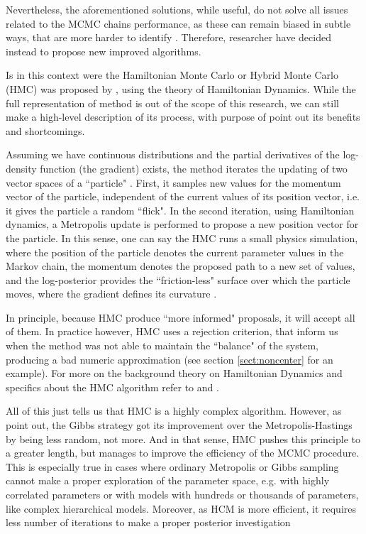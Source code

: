 Nevertheless, the aforementioned solutions, while useful, do not solve all issues related to the MCMC chains performance, as these can remain biased in subtle ways, that are more harder to identify \cite{McElreath_2020}. Therefore, researcher have decided instead to propose new improved algorithms. 

Is in this context were the Hamiltonian Monte Carlo or Hybrid Monte Carlo (HMC) was proposed by \citet{Duane_et_al_1987}, using the theory of Hamiltonian Dynamics. While the full representation of method is out of the scope of this research, we can still make a high-level description of its process, with purpose of point out its benefits and shortcomings. 

Assuming we have continuous distributions and the partial derivatives of the log-density function (the gradient) exists, the method iterates the updating of two vector spaces of a ``particle" \cite{Neal_2011, McElreath_2020}. First, it samples new values for the momentum vector of the particle, independent of the current values of its position vector, i.e. it gives the particle a random ``flick". In the second iteration, using Hamiltonian dynamics, a Metropolis update is performed to propose a new position vector for the particle. In this sense, one can say the HMC runs a small physics simulation, where the position of the particle denotes the current parameter values in the Markov chain, the momentum denotes the proposed path to a new set of values, and the log-posterior provides the ``friction-less" surface over which the particle moves, where the gradient defines its curvature \cite{McElreath_2020}.

In principle, because HMC produce ``more informed" proposals, it will accept all of them. In practice however, HMC uses a rejection criterion, that inform us when the method was not able to maintain the ``balance" of the system, producing a bad numeric approximation (see section \ref{sect:noncenter} for an example). For more on the background theory on Hamiltonian Dynamics and specifics about the HMC algorithm refer to \citet{Neal_2011} and \citet{Betancourt_et_al_2013}.

All of this just tells us that HMC is a highly complex algorithm. However, as \citet{McElreath_2020} point out, the Gibbs strategy got its improvement over the Metropolis-Hastings by being less random, not more. And in that sense, HMC pushes this principle to a greater length, but manages to improve the efficiency of the MCMC procedure. This is especially true in cases where ordinary Metropolis or Gibbs sampling cannot make a proper exploration of the parameter space, e.g. with highly correlated parameters or with models with hundreds or thousands of parameters, like complex hierarchical models. Moreover, as HCM is more efficient, it requires less number of iterations to make a proper posterior investigation \cite{McElreath_2020, Gelman_et_al_2014} 

